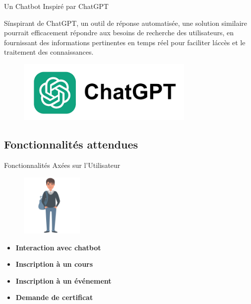 \begin{frame}{Un Chatbot Inspiré par ChatGPT}

    S\'inspirant de ChatGPT, un outil de réponse automatisée, une solution similaire pourrait efficacement répondre aux besoins de recherche des utilisateurs, en fournissant des informations pertinentes en temps réel pour faciliter l\'accès et le traitement des connaissances.

    \begin{figure}[H]
        \centering
        \includegraphics[height=3cm]{assets/images/chatgpt.png}
    \end{figure}
\end{frame}

\subsection{Fonctionnalités attendues}


\begin{frame}{Fonctionnalités Axées sur l'Utilisateur}
    \begin{figure}[H]
        \centering
        \includegraphics[height=3cm]{assets/images/user.png}
    \end{figure}
    \begin{itemize}
        \setlength\itemsep{0.8em} %
        \item \textbf{Interaction avec chatbot}
        \item \textbf{Inscription à un cours}
        \item \textbf{Inscription à un événement}
        \item \textbf{Demande de certificat}

    \end{itemize}

\end{frame}


